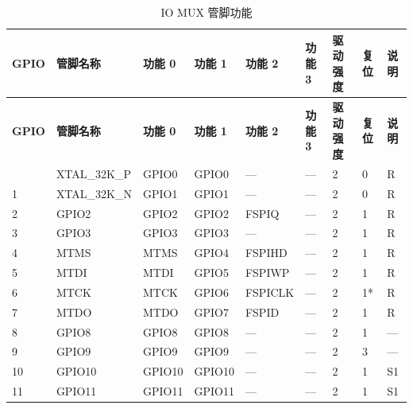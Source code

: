 
   \begin{longtable}[c]{|p{0.7cm}|p{1.9cm}|p{1.9cm}|p{1.6cm}|p{1.6cm}|p{1.6cm}|p{1cm}|p{1cm}|p{1.2cm}| }
   \caption{IO MUX 管脚功能}
    \label{table:iomux_pads} \\
        \hline
        \rowcolor{lightgray}
\textbf{GPIO} & \textbf{管脚名称} & \textbf{功能 0} & \textbf{功能 1} & \textbf{功能 2} & \textbf{功能 3} & \textbf{驱动强度} & \textbf{复位} & \textbf{说明} \\
 \hline
\endfirsthead
        \hline
        \rowcolor{lightgray}
        \textbf{GPIO} & \textbf{管脚名称} & \textbf{功能 0} & \textbf{功能 1} & \textbf{功能 2} & \textbf{功能 3} & \textbf{驱动强度} & \textbf{复位} & \textbf{说明} \\
        \hline
        \endhead
        \endfoot
0 & XTAL\_32K\_P     & GPIO0         & GPIO0   & ---          & ---            & 2           & 0 & R \\ \hline
1 & XTAL\_32K\_N     & GPIO1         & GPIO1   & ---          & ---            & 2           & 0 & R \\ \hline
2 & GPIO2            & GPIO2         & GPIO2   & FSPIQ      & ---            & 2           & 1 & R \\ \hline
3 & GPIO3            & GPIO3         & GPIO3   & ---          & ---            & 2           & 1 & R \\ \hline
4 & MTMS             & MTMS          & GPIO4   & FSPIHD     & ---            & 2           & 1 & R \\ \hline
5 & MTDI             & MTDI          & GPIO5   & FSPIWP     & ---            & 2           & 1 & R \\ \hline
6 & MTCK             & MTCK          & GPIO6   & FSPICLK    & ---            & 2           & 1* & R \\ \hline
7 & MTDO             & MTDO          & GPIO7   & FSPID      & ---            & 2           & 1 & R \\ \hline
8 & GPIO8            & GPIO8         & GPIO8   & ---          & ---            & 2           & 1 & --- \\ \hline
9 & GPIO9            & GPIO9         & GPIO9   & ---          & ---            & 2           & 3 & --- \\ \hline
10 & GPIO10          & GPIO10        & GPIO10  & ---          & ---            & 2           & 1 & S1 \\ \hline
11 & GPIO11          & GPIO11        & GPIO11  & ---          & ---            & 2           & 1 & S1 \\ \hline

\end{longtable}
